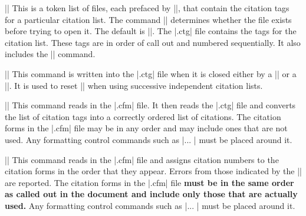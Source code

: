 \ext\@||
\nbr
This is a token list of files, each prefaced by 
||,  that contain the citation tags for a particular citation
list. The command || determines whether the file exists
before trying to open it. The default is ||.
The |\jobname.ctg| file contains the tags for the citation list.
These tags are in order of call out and numbered
sequentially. It also includes the |\initcitetag| command. 

\mbr
\ext\@||
\nbr
This command is written into the |.ctg| file when it is 
closed either by a |\closecitationtagfile| or a 
|\makecitationlist|. It is used to reset |\citenum| when using successive 
independent 
citation lists.



\mbr
\ext\@|\makecitationlist|
\nbr
This command reads in the |\jobname.cfm| file. It then reads the
|\jobname.ctg| file and converts the list of citation tags into 
a correctly ordered list of citations. The citation forms  in the 
|\jobname.cfm| file may be in any order and may include ones that are not
used. 
Any  formatting control commands such as 
|\beginlist ... \endlist| must be placed around it.


\mbr
\ext\@|\makelongcitationlist|
\nbr
This command reads in the |\jobname.cfm| file and assigns citation numbers 
to the citation forms in the order that they appear. Errors from those
indicated by the |\citetagvalue| are reported. 
 The citation forms  in the 
|\jobname.cfm| file {\bf must be in the same order as called out in the
document and include only those that are actually used.}
Any  formatting control commands such as 
|\beginlist ... \endlist| must be placed around it.


\endblockmode
\ejectpage

\done